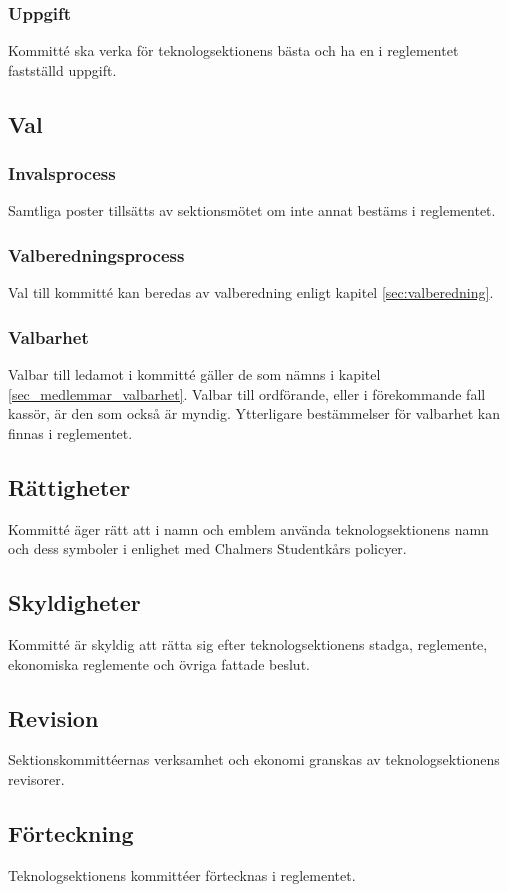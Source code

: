 \documentclass[a4paper]{dtek}
\begin{document}
\subsubsection{Uppgift}
Kommitté ska verka för teknologsektionens bästa och ha en i reglementet fastställd uppgift.

\subsection{Val}
\subsubsection{Invalsprocess}
Samtliga poster tillsätts av sektionsmötet om inte annat bestäms i reglementet. 
\subsubsection{Valberedningsprocess}
  Val till kommitté kan beredas av valberedning enligt kapitel \ref{sec:valberedning}.

\subsubsection{Valbarhet}
Valbar till ledamot i kommitté gäller de som nämns i kapitel \ref{sec_medlemmar_valbarhet}.
Valbar till ordförande, eller i förekommande fall kassör, är den som också är myndig.
Ytterligare bestämmelser för valbarhet kan finnas i reglementet.

\subsection{Rättigheter}
Kommitté äger rätt att i namn och emblem använda teknologsektionens namn och dess symboler i enlighet med Chalmers Studentkårs policyer.
\subsection{Skyldigheter}
Kommitté är skyldig att rätta sig efter teknologsektionens stadga, reglemente, ekonomiska reglemente och övriga fattade beslut.
\subsection{Revision}
Sektionskommittéernas verksamhet och ekonomi granskas av teknologsektionens revisorer.
\subsection{Förteckning}
Teknologsektionens kommittéer förtecknas i reglementet.
\newpage
\end{document}

